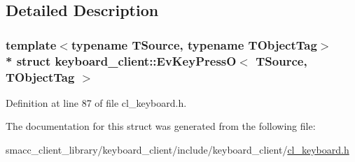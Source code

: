 \subsection{Detailed Description}
\subsubsection*{template$<$typename T\+Source, typename T\+Object\+Tag$>$\\*
struct keyboard\+\_\+client\+::\+Ev\+Key\+Press\+O$<$ T\+Source, T\+Object\+Tag $>$}



Definition at line 87 of file cl\+\_\+keyboard.\+h.



The documentation for this struct was generated from the following file\+:\begin{DoxyCompactItemize}
\item 
smacc\+\_\+client\+\_\+library/keyboard\+\_\+client/include/keyboard\+\_\+client/\hyperlink{cl__keyboard_8h}{cl\+\_\+keyboard.\+h}\end{DoxyCompactItemize}
